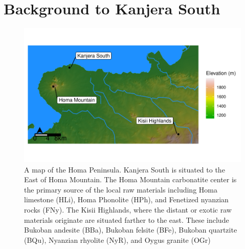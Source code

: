 \documentclass[]{elsarticle} %
\makeatletter
\def\maxwidth{\ifdim\Gin@nat@width>\linewidth\linewidth
\else\Gin@nat@width\fi}
\let\Oldincludegraphics\includegraphics
\renewcommand{\includegraphics}[1]{\Oldincludegraphics[width=\maxwidth]{#1}}
\makeatother
\begin{document}
\hypertarget{background-to-kanjera-south}{%
\section{Background to Kanjera
South}\label{background-to-kanjera-south}}

\begin{figure}
\centering
\includegraphics{Reeves_Braun_et_al_2020_Kanjera_South_JHE_files/figure-latex/unnamed-chunk-2-1.pdf}
\caption{A map of the Homa Peninsula. Kanjera South is situated to the
East of Homa Mountain. The Homa Mountain carbonatite center is the
primary source of the local raw materials including Homa limestone
(HLi), Homa Phonolite (HPh), and Fenetized nyanzian rocks (FNy). The
Kisii Highlands, where the distant or exotic raw materials originate are
situated farther to the east. These include Bukoban andesite (BBa),
Bukoban felsite (BFe), Bukoban quartzite (BQu), Nyanzian rhyolite (NyR),
and Oygus granite (OGr) \label{map}}
\end{figure}
\end{document}
